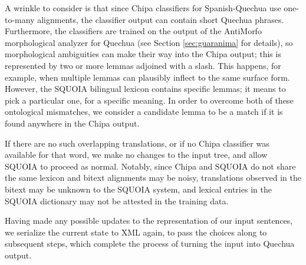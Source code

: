 A wrinkle to consider is that since Chipa classifiers for Spanish-Quechua use
one-to-many alignments, the classifier output can contain short Quechua
phrases. Furthermore, the classifiers are trained on the output of the
AntiMorfo morphological analyzer for Quechua (see Section \ref{sec:guaranima}
for details), so morphological ambiguities can make their way into the Chipa
output; this is represented by two or more lemmas adjoined with a slash. This
happens, for example, when multiple lemmas can plausibly inflect to the same
surface form. However, the SQUOIA bilingual lexicon contains specific lemmas;
it means to pick a particular one, for a specific meaning. In order to overcome
both of these ontological mismatches, we consider a candidate lemma to be a
match if it is found anywhere in the Chipa output. 

If there are no such overlapping translations, or if no Chipa classifier was
available for that word, we make no changes to the input tree, and allow SQUOIA
to proceed as normal. Notably, since Chipa and SQUOIA do not share the same
lexicon and bitext alignments may be noisy, translations observed in the bitext
may be unknown to the SQUOIA system, and lexical entries in the SQUOIA
dictionary may not be attested in the training data.

Having made any possible updates to the representation of our input sentences,
we serialize the current state to XML again, to pass the choices along to
subsequent steps, which complete the process of turning the input into Quechua
output.


